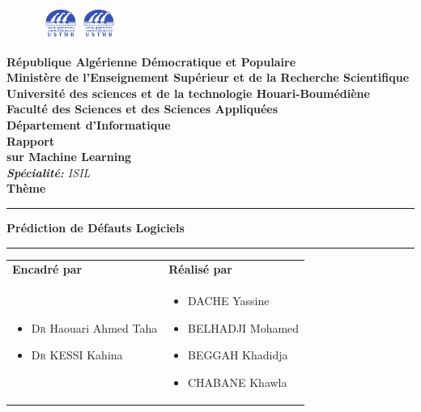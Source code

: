 \begin{titlepage}

\begin{figure}[htbp]
 \hbox{
     \includegraphics[width=40px]{Imag/Logo_USTHB.png}
     \hspace*{12.5cm}
     \includegraphics[width=40px]{Imag/Logo_USTHB.png}
  }
\end{figure}

\vspace {-1.8cm}

\begin{center}
{\bf R\'{e}publique Alg\'{e}rienne D\'emocratique et Populaire\\
	\vspace{0.3cm}
Minist\`{e}re de l'Enseignement Sup\'{e}rieur et de la
Recherche Scientifique} \vspace{0.2cm}\\

{\bf {\large Université des sciences et de la technologie Houari-Boumédiène}}\\

{\bf Facult\'{e} des Sciences et des Sciences Appliquées} \\

{ \textbf{D\'epartement d'Informatique}}\\ \vspace{0.8cm}
\Huge{\textbf{Rapport}} \\ \Large{\textbf{sur Machine Learning}} \\\vspace{0.3cm}
\large{\emph{\textbf{Spécialité:} ISIL}}\\ \vspace{0.8cm}
\huge{\textbf{Thème}}\\ %
\noindent\rule{\textwidth}{1mm}
\Large{\textbf{Prédiction de Défauts Logiciels}}
\noindent\rule{\textwidth}{1mm}
\end{center}
\vspace{0.3cm}
\begin{tabular}{ p{9cm}  p{6cm} }
\textbf{Encadré par} & \textbf{Réalisé par} \\
\begin{itemize}
	\item \textsc{Dr} Haouari Ahmed Taha
        \item \textsc{Dr} KESSI Kahina
\end{itemize}
&
\begin{itemize}
	\item \textsc{DACHE} Yassine
	\item \textsc{BELHADJI} Mohamed
        \item \textsc{BEGGAH} Khadidja
	\item \textsc{CHABANE} Khawla


\end{itemize}
\end{tabular}
\end{titlepage}
